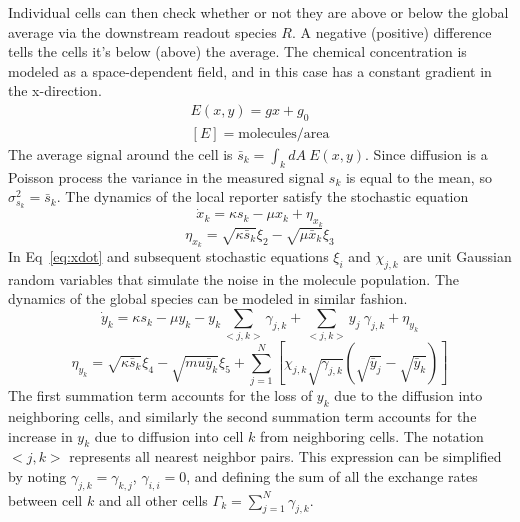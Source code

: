 \documentclass[a4paper]{article}
\begin{document}
Individual cells can then check whether or not they are above or below the global average via the downstream readout species $R$. A negative (positive) difference tells the cells it's below (above) the average. The chemical concentration is modeled as a space-dependent field, and in this case has a constant gradient in the x-direction.
\begin{gather*}
    E(x,y) = gx + g_0 \\[0pt]
    [ E ] = \text{molecules} / \text{area}
\end{gather*}
The average signal around the cell is $\bar{s}_k = \int_k dA \ E(x,y)$. Since diffusion is a Poisson process the variance in the measured signal $s_k$ is equal to the mean, so $\sigma_{s_k}^2 = \bar{s}_k$. The dynamics of the local reporter satisfy the stochastic equation
\begin{equation} \label{eq:xdot}
    \dot{x}_k = \kappa s_k - \mu x_k + \eta_{x_k}
\end{equation}
\begin{equation*}
    \eta_{x_k} = \sqrt{\kappa\bar{s}_k}\xi_2 - \sqrt{\mu \bar{x}_k} \xi_3
\end{equation*}
In Eq\ \ref{eq:xdot} and subsequent stochastic equations $\xi_i$ and $\chi_{j,k}$ are unit Gaussian random variables that simulate the noise in the molecule population. The dynamics of the global species can be modeled in similar fashion.
\begin{equation} \label{eq:ydot}
    \dot{y}_k = \kappa s_k - \mu y_k - y_k \sum_{<j,k>} \gamma_{j,k} + \sum_{<j,k>} y_j \ \gamma_{j,k} + \eta_{y_k}
\end{equation}
\begin{equation*}
    \eta_{y_k} = \sqrt{\kappa \bar{s}_k} \xi_4 - \sqrt{mu\bar{y}_k} \xi_5 + \sum_{j=1}^N \left[ \chi_{j,k} \sqrt{\gamma_{j,k}} \left( \sqrt{\bar{y}_j}-\sqrt{\bar{y}_k} \right) \right]
\end{equation*}
The first summation term accounts for the loss of $y_k$ due to the diffusion into neighboring cells, and similarly the second summation term accounts for the increase in $y_k$ due to diffusion into cell $k$ from neighboring cells. The notation $<j,k>$ represents all nearest neighbor pairs. This expression can be simplified by noting $\gamma_{j,k}=\gamma_{k,j}$, $\gamma_{i,i}=0$, and defining the sum of all the exchange rates between cell $k$ and all other cells $\Gamma_k = \sum_{j=1}^N \gamma_{j,k}$.
\end{document}
